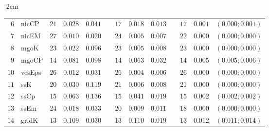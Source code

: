 \begin{table*}[!htbp]
\begin{adjustwidth*}{}{-2cm}
\begin{tabular}{@{}rlrrrrrrrrrcc@{}}
\footnotesize{$6 $} & \footnotesize{nicCP    } & \footnotesize{$21$} & \footnotesize{$0.028$} & \footnotesize{$0.041$} && \footnotesize{$17$} & \footnotesize{$0.018$} & \footnotesize{$0.013$} && \footnotesize{$17$} & \footnotesize{$0.001$} & \footnotesize{$(0.000;0.001)$} \\
\footnotesize{$7 $} & \footnotesize{nicEM    } & \footnotesize{$27$} & \footnotesize{$0.010$} & \footnotesize{$0.020$} && \footnotesize{$24$} & \footnotesize{$0.005$} & \footnotesize{$0.007$} && \footnotesize{$22$} & \footnotesize{$0.000$} & \footnotesize{$(0.000;0.000)$} \\
\footnotesize{$8 $} & \footnotesize{mgoK     } & \footnotesize{$23$} & \footnotesize{$0.022$} & \footnotesize{$0.096$} && \footnotesize{$23$} & \footnotesize{$0.005$} & \footnotesize{$0.008$} && \footnotesize{$23$} & \footnotesize{$0.000$} & \footnotesize{$(0.000;0.000)$} \\
\footnotesize{$9 $} & \footnotesize{mgoCP    } & \footnotesize{$14$} & \footnotesize{$0.081$} & \footnotesize{$0.098$} && \footnotesize{$14$} & \footnotesize{$0.063$} & \footnotesize{$0.032$} && \footnotesize{$14$} & \footnotesize{$0.005$} & \footnotesize{$(0.005;0.006)$} \\
\footnotesize{$10$} & \footnotesize{vesEps   } & \footnotesize{$26$} & \footnotesize{$0.012$} & \footnotesize{$0.031$} && \footnotesize{$26$} & \footnotesize{$0.004$} & \footnotesize{$0.006$} && \footnotesize{$26$} & \footnotesize{$0.000$} & \footnotesize{$(0.000;0.000)$} \\
\footnotesize{$11$} & \footnotesize{ssK      } & \footnotesize{$20$} & \footnotesize{$0.030$} & \footnotesize{$0.119$} && \footnotesize{$21$} & \footnotesize{$0.006$} & \footnotesize{$0.008$} && \footnotesize{$21$} & \footnotesize{$0.000$} & \footnotesize{$(0.000;0.000)$} \\
\footnotesize{$12$} & \footnotesize{ssCp     } & \footnotesize{$15$} & \footnotesize{$0.063$} & \footnotesize{$0.136$} && \footnotesize{$15$} & \footnotesize{$0.041$} & \footnotesize{$0.019$} && \footnotesize{$15$} & \footnotesize{$0.002$} & \footnotesize{$(0.002;0.002)$} \\
\footnotesize{$13$} & \footnotesize{ssEm     } & \footnotesize{$24$} & \footnotesize{$0.018$} & \footnotesize{$0.033$} && \footnotesize{$20$} & \footnotesize{$0.009$} & \footnotesize{$0.011$} && \footnotesize{$18$} & \footnotesize{$0.000$} & \footnotesize{$(0.000;0.000)$} \\
\footnotesize{$14$} & \footnotesize{gridK    } & \footnotesize{$13$} & \footnotesize{$0.109$} & \footnotesize{$0.030$} && \footnotesize{$13$} & \footnotesize{$0.110$} & \footnotesize{$0.019$} && \footnotesize{$13$} & \footnotesize{$0.012$} & \footnotesize{$(0.011;0.014)$} \\

\end{tabular}
\end{adjustwidth*}
\end{table*}
